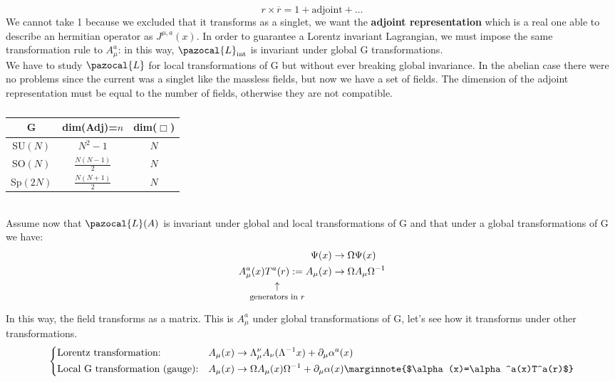 \documentclass[../main.tex]{subfiles}
\begin{document}
\[
r\times\overline{r}=1+\text{adjoint}+\dots
\]
We cannot take 1 because we excluded that it transforms as a singlet, we want the \textbf{adjoint representation} which is a real one able to describe an hermitian operator as $J^{\mu,a}(x)$. In order to guarantee a Lorentz invariant Lagrangian, we must impose the same transformation rule to $A_\mu^a$: in this way, $\pazocal{L}_{\text{int}}$ is invariant under global G transformations.\\
We have to study $\pazocal{L}$ for local transformations of G but without ever breaking global invariance. In the abelian case there were no problems since the current was a singlet like the massless fields, but now we have a set of fields. The dimension of the adjoint representation must be equal to the number of fields, otherwise they are not compatible.
\begin{table}[h]
    \centering
    \begin{tabular}{ccc}
    G & dim(Adj)=$n$ & dim($\Box$) \\
    \hline
    SU$(N)$ & $N^2-1$ & $N$ \\
    SO$(N)$ & $\frac{N(N-1)}{2}$ & $N$ \\
    Sp$(2N)$ & $\frac{N(N+1)}{2}$ & $N$ \\
    \hline
    \end{tabular}
    \caption*{}
    \label{tab:my_label}
\end{table}\\
Assume now that $\pazocal{L}(A)$ is invariant under global and local transformations of G and that under a global transformations of G we have:
\begin{align*}
\Psi(x)&\to\Omega\Psi(x)\\
A_\mu^a(x)\underset{\mathclap{\tikz \node {$\uparrow$} node [below=1ex] {\footnotesize  generators in $r$};}}{T^a(r)}:=A_\mu(x)&\to\Omega A_\mu\Omega^{-1}
\end{align*}
In this way, the field transforms as a matrix. This is $A_\mu^a$ under global transformations of G, let's see how it transforms under other transformations.
\[
\left\{
\begin{aligned}
&\text{Lorentz transformation:} &&A_\mu(x)\to\Lambda_\mu^\nu A_\nu(\Lambda^{-1}x)+\partial_\mu\alpha^a(x)\\
&\text{Local G transformation (gauge):} &&A_\mu(x)\to\Omega A_\mu(x)\Omega^{-1}+\partial_\mu\alpha(x)\marginnote{$\alpha(x)=\alpha^a(x)T^a(r)$}
\end{aligned}
\right.
\]
\end{document}
